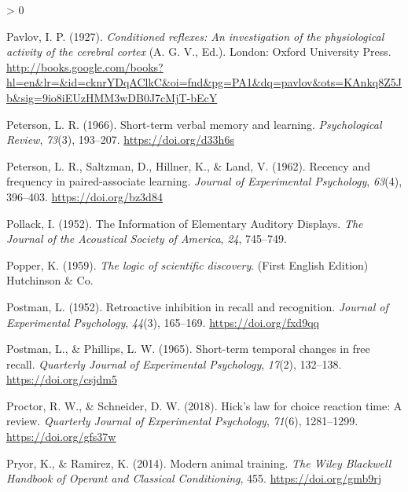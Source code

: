 \documentclass[
  oneside,
  12pt]{crumpbook}
\newlength{\cslhangindent}
\newenvironment{CSLReferences}[2] %
 {%
  \setlength{\parindent}{0pt}
  \ifodd #1 \everypar{\setlength{\hangindent}{\cslhangindent}}\ignorespaces\fi
  \ifnum #2 > 0
  \setlength{\parskip}{#2\baselineskip}
  \fi
 }%
 {}
\begin{document}
\begin{CSLReferences}{1}{0}
\leavevmode\hypertarget{ref-pavlovConditionedReflexesInvestigation1927}{}%
Pavlov, I. P. (1927). \emph{Conditioned reflexes: {An} investigation of the physiological activity of the cerebral cortex} (A. G. V., Ed.). {London: Oxford University Press}. \url{http://books.google.com/books?hl=en\&lr=\&id=cknrYDqAClkC\&oi=fnd\&pg=PA1\&dq=pavlov\&ots=KAnkq8Z5Jb\&sig=9io8iEUzHMM3wDB0J7cMjT-bEcY}

\leavevmode\hypertarget{ref-petersonShorttermVerbalMemory1966}{}%
Peterson, L. R. (1966). Short-term verbal memory and learning. \emph{Psychological Review}, \emph{73}(3), 193--207. \url{https://doi.org/d33h6s}

\leavevmode\hypertarget{ref-petersonRecencyFrequencyPairedassociate1962}{}%
Peterson, L. R., Saltzman, D., Hillner, K., \& Land, V. (1962). Recency and frequency in paired-associate learning. \emph{Journal of Experimental Psychology}, \emph{63}(4), 396--403. \url{https://doi.org/bz3d84}

\leavevmode\hypertarget{ref-pollackInformationElementaryAuditory1952a}{}%
Pollack, I. (1952). The {Information} of {Elementary Auditory Displays}. \emph{The Journal of the Acoustical Society of America}, \emph{24}, 745--749.

\leavevmode\hypertarget{ref-popperLogicScientificDiscovery1959}{}%
Popper, K. (1959). \emph{The logic of scientific discovery}. {(First English Edition) Hutchinson \& Co}.

\leavevmode\hypertarget{ref-postmanRetroactiveInhibitionRecall1952}{}%
Postman, L. (1952). Retroactive inhibition in recall and recognition. \emph{Journal of Experimental Psychology}, \emph{44}(3), 165--169. \url{https://doi.org/fxd9qq}

\leavevmode\hypertarget{ref-postmanShorttermTemporalChanges1965}{}%
Postman, L., \& Phillips, L. W. (1965). Short-term temporal changes in free recall. \emph{Quarterly Journal of Experimental Psychology}, \emph{17}(2), 132--138. \url{https://doi.org/csjdm5}

\leavevmode\hypertarget{ref-proctorHickLawChoice2018}{}%
Proctor, R. W., \& Schneider, D. W. (2018). Hick's law for choice reaction time: {A} review. \emph{Quarterly Journal of Experimental Psychology}, \emph{71}(6), 1281--1299. \url{https://doi.org/gfs37w}

\leavevmode\hypertarget{ref-pryorModernAnimalTraining2014}{}%
Pryor, K., \& Ramirez, K. (2014). Modern animal training. \emph{The Wiley Blackwell Handbook of Operant and Classical Conditioning}, 455. \url{https://doi.org/gmb9rj}


\end{CSLReferences}
\end{document}
